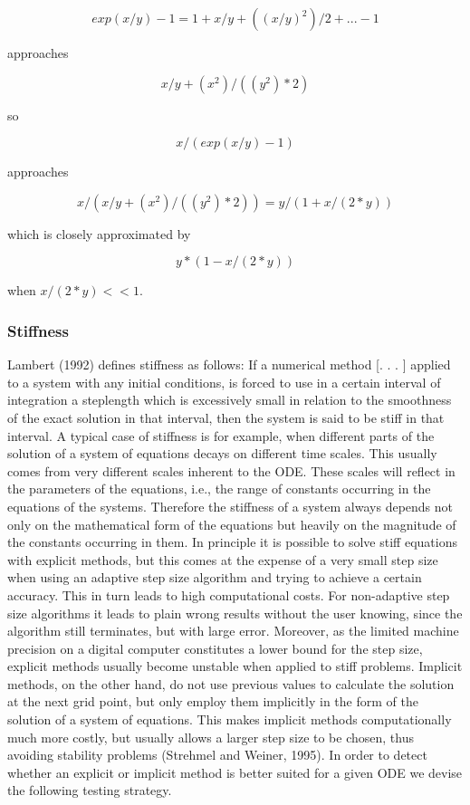 $$exp(x/y) - 1 = 1 + x/y + ((x/y)^2)/2 + . . . - 1$$

approaches

$$x/y + (x^2)/((y^2)*2)$$

so

$$x / (exp(x/y) - 1)$$

approaches

$$x / (x/y + (x^2)/((y^2)*2)) = y / (1 + x/(2*y))$$

which is closely approximated by

$$y * (1 - x/(2*y))$$

when $x/(2*y) << 1$.

\subsubsection{Stiffness}

Lambert (1992) defines stiffness as follows:
If a numerical method [. . . ] applied to a system
with any initial conditions, is forced to use in a
certain interval of integration a steplength which is
excessively small in relation to the smoothness of the
exact solution in that interval, then the system is said
to be stiff in that interval.
A typical case of stiffness is for example, when different parts of
the solution of a system of equations decays on different time
scales.
This usually comes from very different scales inherent to the
ODE. These scales will reflect in the parameters of the equations,
i.e., the range of constants occurring in the equations of the
systems. Therefore the stiffness of a system always depends not
only on the mathematical form of the equations but heavily on
the magnitude of the constants occurring in them.
In principle it is possible to solve stiff equations with explicit
methods, but this comes at the expense of a very small step size
when using an adaptive step size algorithm and trying to achieve
a certain accuracy. This in turn leads to high computational
costs. For non-adaptive step size algorithms it leads to plain
wrong results without the user knowing, since the algorithm
still terminates, but with large error. Moreover, as the limited
machine precision on a digital computer constitutes a lower
bound for the step size, explicit methods usually become unstable
when applied to stiff problems.
Implicit methods, on the other hand, do not use previous
values to calculate the solution at the next grid point, but only
employ them implicitly in the form of the solution of a system of
equations. This makes implicit methods computationally much
more costly, but usually allows a larger step size to be chosen,
thus avoiding stability problems (Strehmel and Weiner, 1995).
In order to detect whether an explicit or implicit method is
better suited for a given ODE we devise the following testing
strategy.

